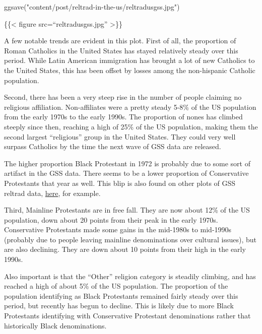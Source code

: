 \documentclass[
]{article}
\newenvironment{Shaded}{\begin{snugshade}}{\end{snugshade}}
\newcommand{\NormalTok}[1]{#1}
\begin{document}
\begin{Shaded}
\begin{Highlighting}[]
\NormalTok{ggsave("content/post/reltrad{-}in{-}the{-}us/reltradusgss.jpg")}
\end{Highlighting}
\end{Shaded}

\{\{\textless{} figure src=``reltradusgss.jpg'' \textgreater\}\}

A few notable trends are evident in this plot. First of all, the
proportion of Roman Catholics in the United States has stayed relatively
steady over this period. While Latin American immigration has brought a
lot of new Catholics to the United States, this has been offset by
losses among the non-hispanic Catholic population.

Second, there has been a very steep rise in the number of people
claiming no religious affiliation. Non-affiliates were a pretty steady
5-8\% of the US population from the early 1970s to the early 1990s. The
proportion of nones has climbed steeply since then, reaching a high of
25\% of the US population, making them the second largest ``religious''
group in the United States. They could very well surpass Catholics by
the time the next wave of GSS data are released.

The higher proportion Black Protestant in 1972 is probably due to some
sort of artifact in the GSS data. There seems to be a lower proportion
of Conservative Protestants that year as well. This blip is also found
on other plots of GSS reltrad data,
\href{https://thesocietypages.org/ccf/2014/07/09/religious-change/fig-2-religious-change/}{here},
for example.

Third, Mainline Protestants are in free fall. They are now about 12\% of
the US population, down about 20 points from their peak in the early
1970s. Conservative Protestants made some gains in the mid-1980s to
mid-1990s (probably due to people leaving mainline denominations over
cultural issues), but are also declining. They are down about 10 points
from their high in the early 1990s.

Also important is that the ``Other'' religion category is steadily
climbing, and has reached a high of about 5\% of the US population. The
proportion of the population identifying as Black Protestants remained
fairly steady over this period, but recently has begun to decline. This
is likely due to more Black Protestants identifying with Conservative
Protestant denominations rather that historically Black denominations.
\end{document}
